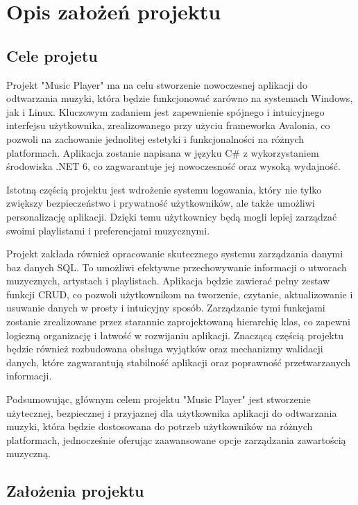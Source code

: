 \chapter{Opis założeń projektu}
\section{Cele projetu}

Projekt "Music Player" ma na celu stworzenie nowoczesnej aplikacji do odtwarzania muzyki, która będzie funkcjonować zarówno na systemach Windows, jak i Linux. Kluczowym zadaniem jest zapewnienie spójnego i intuicyjnego interfejsu użytkownika, zrealizowanego przy użyciu frameworka Avalonia, co pozwoli na zachowanie jednolitej estetyki i funkcjonalności na różnych platformach. Aplikacja zostanie napisana w języku C\# z wykorzystaniem środowiska .NET 6, co zagwarantuje jej nowoczesność oraz wysoką wydajność.

Istotną częścią projektu jest wdrożenie systemu logowania, który nie tylko zwiększy bezpieczeństwo i prywatność użytkowników, ale także umożliwi personalizację aplikacji. Dzięki temu użytkownicy będą mogli lepiej zarządzać swoimi playlistami i preferencjami muzycznymi.

Projekt zakłada również opracowanie skutecznego systemu zarządzania danymi baz danych SQL. To umożliwi efektywne przechowywanie informacji o utworach muzycznych, artystach i playlistach. Aplikacja będzie zawierać pełny zestaw funkcji CRUD, co pozwoli użytkownikom na tworzenie, czytanie, aktualizowanie i usuwanie danych w prosty i intuicyjny sposób. Zarządzanie tymi funkcjami zostanie zrealizowane przez starannie zaprojektowaną hierarchię klas, co zapewni logiczną organizację i łatwość w rozwijaniu aplikacji. Znaczącą częścią projektu będzie również rozbudowana obsługa wyjątków oraz mechanizmy walidacji danych, które zagwarantują stabilność aplikacji oraz poprawność przetwarzanych informacji.

Podsumowując, głównym celem projektu "Music Player" jest stworzenie użytecznej, bezpiecznej i przyjaznej dla użytkownika aplikacji do odtwarzania muzyki, która będzie dostosowana do potrzeb użytkowników na różnych platformach, jednocześnie oferując zaawansowane opcje zarządzania zawartością muzyczną.

\section{Założenia projektu}

